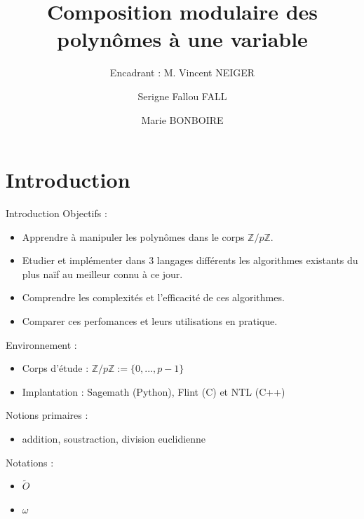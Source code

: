 \documentclass[10pt,a4paper]{beamer}
\institute{Sorbonne Université}
\title[Center text]{\textbf{Composition modulaire des polynômes à une variable}}
\subtitle{\small{Encadrant : M. Vincent NEIGER}}
\author{Serigne Fallou FALL \and Marie BONBOIRE}
\date{}
\begin{document}
\begin{frame}[plain]
    \titlepage
\end{frame}

\begin{frame}
    \tableofcontents
\end{frame}

\section{Introduction}
\begin{frame}{Introduction}
    Objectifs :
    \begin{itemize}
        \item Apprendre à manipuler les polynômes dans le corps ${\mathbb{Z}/p \mathbb{Z}}$.
        \item Etudier et implémenter dans 3 langages différents les algorithmes existants du plus naïf au meilleur connu à ce jour.
        \item Comprendre les complexités et l'efficacité de ces algorithmes. 
        \item Comparer ces perfomances et leurs utilisations en pratique.
    \end{itemize}

    Environnement :
    \begin{itemize}
        \item Corps d'étude : $\mathbb{Z}/p\mathbb{Z} := \{0, ..., p-1\}$
        \item Implantation : Sagemath (Python), Flint (C) et NTL (C++)  
    \end{itemize}

    Notions primaires :
    \begin{itemize}
        \item addition, soustraction, division euclidienne
    \end{itemize}

    Notations  :
    \begin{itemize}
        \item $\tilde{O}$
        \item $\omega$
    \end{itemize}
\end{frame}

\end{document}

